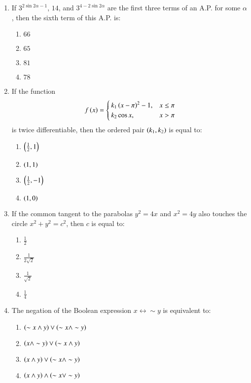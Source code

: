 \documentclass[journal]{IEEEtran}
\begin{document}
\begin{enumerate}
    \item If $3 ^ {2 \sin 2\alpha - 1}$, $14$, and $3 ^ {4 - 2 \sin 2\alpha}$ are the first three terms of an A.P. for some $\alpha$, then the sixth term of this A.P. is:
    \begin{enumerate}
        \item $66$
        \item $65$
        \item $81$
        \item $78$
    \end{enumerate}

    \item If the function 
    \begin{equation*}
    f\left(x\right) = 
    \begin{cases}
    k_1 \left(x-\pi\right)^2 -1, & x \leq \pi \\
    k_2 \cos x, & x > \pi
    \end{cases}
    \end{equation*}
    is twice differentiable, then the ordered pair $\left(k_1, k_2\right)$ is equal to:
    \begin{enumerate}
        \item $\left(\frac{1}{2}, 1\right)$
        \item $\left(1, 1\right)$
        \item $\left(\frac{1}{2}, -1\right)$
        \item $\left(1, 0\right)$
    \end{enumerate}

    \item If the common tangent to the parabolas $y^2 = 4x$ and $x^2 = 4y$ also touches the circle $x^2 + y^2 = c^2$, then $c$ is equal to:
    \begin{enumerate}
        \item $\frac{1}{2}$
        \item $\frac{1}{2\sqrt{2}}$
        \item $\frac{1}{\sqrt{2}}$
        \item $\frac{1}{4}$
    \end{enumerate}

    \item The negation of the Boolean expression $x \leftrightarrow \sim y$ is equivalent to:
    \begin{enumerate}
        \item $\left(\sim x \land y\right) \lor \left(\sim x \land \sim y\right)$
        \item $\left(x \land \sim y\right) \lor \left(\sim x \land y\right)$
        \item $\left(x \land y\right) \lor \left(\sim x \land \sim y\right)$
        \item $\left(x \land y\right) \land \left(\sim x \lor \sim y\right)$
    \end{enumerate}


\end{enumerate}
\end{document}
